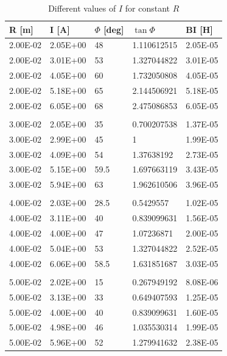 \documentclass{article}
\begin{document}
\begin{table}[H]
\begin{tabular}{|l|l|l|l|l|}
\hline
R {[}m{]} & I {[}A{]} & \(\Phi\) {[}deg{]} & \(\tan{\Phi}\)        & BI {[}H{]} \\ \hline
2.00E-02  & 2.05E+00  & 48          & 1.110612515 & 2.05E-05   \\ \hline
2.00E-02  & 3.01E+00  & 53          & 1.327044822 & 3.01E-05   \\ \hline
2.00E-02  & 4.05E+00  & 60          & 1.732050808 & 4.05E-05   \\ \hline
2.00E-02  & 5.18E+00  & 65          & 2.144506921 & 5.18E-05   \\ \hline
2.00E-02  & 6.05E+00  & 68          & 2.475086853 & 6.05E-05   \\ \hline
          &           &             &             &            \\ \hline
3.00E-02  & 2.05E+00  & 35          & 0.700207538 & 1.37E-05   \\ \hline
3.00E-02  & 2.99E+00  & 45          & 1           & 1.99E-05   \\ \hline
3.00E-02  & 4.09E+00  & 54          & 1.37638192  & 2.73E-05   \\ \hline
3.00E-02  & 5.15E+00  & 59.5        & 1.697663119 & 3.43E-05   \\ \hline
3.00E-02  & 5.94E+00  & 63          & 1.962610506 & 3.96E-05   \\ \hline
          &           &             &             &            \\ \hline
4.00E-02  & 2.03E+00  & 28.5        & 0.5429557   & 1.02E-05   \\ \hline
4.00E-02  & 3.11E+00  & 40          & 0.839099631 & 1.56E-05   \\ \hline
4.00E-02  & 4.00E+00  & 47          & 1.07236871  & 2.00E-05   \\ \hline
4.00E-02  & 5.04E+00  & 53          & 1.327044822 & 2.52E-05   \\ \hline
4.00E-02  & 6.06E+00  & 58.5        & 1.631851687 & 3.03E-05   \\ \hline
          &           &             &             &            \\ \hline
5.00E-02  & 2.02E+00  & 15          & 0.267949192 & 8.08E-06   \\ \hline
5.00E-02  & 3.13E+00  & 33          & 0.649407593 & 1.25E-05   \\ \hline
5.00E-02  & 4.00E+00  & 40          & 0.839099631 & 1.60E-05   \\ \hline
5.00E-02  & 4.98E+00  & 46          & 1.035530314 & 1.99E-05   \\ \hline
5.00E-02  & 5.96E+00  & 52          & 1.279941632 & 2.38E-05   \\ \hline
\end{tabular}
\caption{Different values of \(I\) for constant \(R\)}
\label{tb:i}
\end{table}
\end{document}

